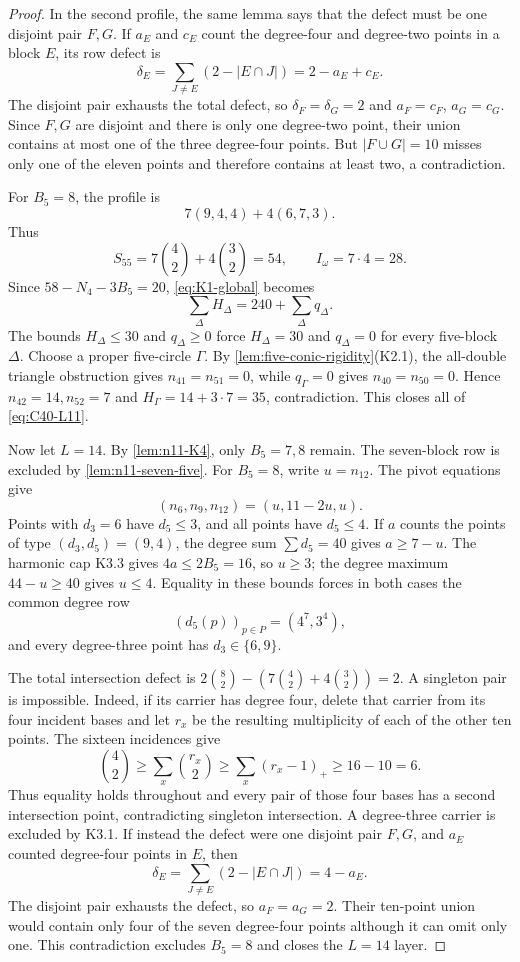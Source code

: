 \begin{proof}
In the second profile, the same lemma says that the defect must be one
disjoint pair $F,G$.  If $a_E$ and $c_E$ count the degree-four and
degree-two points in a block $E$, its row defect is
\[
 \delta_E=\sum_{J\ne E}(2-|E\cap J|)=2-a_E+c_E.
\]
The disjoint pair exhausts the total defect, so
$\delta_F=\delta_G=2$ and $a_F=c_F$, $a_G=c_G$.  Since $F,G$ are disjoint
and there is only one degree-two point, their union contains at most one of
the three degree-four points.  But $|F\cup G|=10$ misses only one of the
eleven points and therefore contains at least two, a contradiction.

For $B_5=8$, the profile is
\[
7(9,4,4)+4(6,7,3).
\]
Thus
\[
 S_{55}=7\binom42+4\binom32=54,
 \qquad I_\omega=7\cdot4=28.
\]
Since $58-N_4-3B_5=20$, \eqref{eq:K1-global} becomes
\[
 \sum_\Delta H_\Delta=240+\sum_\Delta q_\Delta.
\]
The bounds $H_\Delta\le30$ and $q_\Delta\ge0$ force
$H_\Delta=30$ and $q_\Delta=0$ for every five-block $\Delta$.  Choose a
proper five-circle $\Gamma$.  By
\cref{lem:five-conic-rigidity}(K2.1), the all-double triangle obstruction gives
$n_{41}=n_{51}=0$, while $q_\Gamma=0$ gives $n_{40}=n_{50}=0$.  Hence
$n_{42}=14,n_{52}=7$ and
$H_\Gamma=14+3\cdot7=35$, contradiction.  This closes all of
\eqref{eq:C40-L11}.

Now let $L=14$.  By \cref{lem:n11-K4}, only $B_5=7,8$ remain.
The seven-block row is excluded by \cref{lem:n11-seven-five}.  For
$B_5=8$, write $u=n_{12}$.  The pivot equations give
\[
 (n_6,n_9,n_{12})=(u,11-2u,u).
\]
Points with $d_3=6$ have $d_5\le3$, and all points have $d_5\le4$.
If $a$ counts the points of type $(d_3,d_5)=(9,4)$, the degree sum
$\sum d_5=40$ gives $a\ge7-u$.  The harmonic cap K3.3 gives
$4a\le2B_5=16$, so $u\ge3$; the degree maximum $44-u\ge40$ gives
$u\le4$.  Equality in these bounds forces in both cases the common degree
row
\[
 (d_5(p))_{p\in P}=(4^7,3^4),
\]
and every degree-three point has $d_3\in\{6,9\}$.

 The total intersection defect is
 $2\binom82-(7\binom42+4\binom32)=2$.  A singleton pair is impossible.
 Indeed, if its carrier has degree four, delete that carrier from its four
 incident bases and let $r_x$ be the resulting multiplicity of each of the
 other ten points.  The sixteen incidences give
 \[
  \binom42\ge\sum_x\binom{r_x}{2}
  \ge\sum_x(r_x-1)_+\ge16-10=6.
 \]
 Thus equality holds throughout and every pair of those four bases has a
 second intersection point, contradicting singleton intersection.  A
 degree-three carrier is excluded by K3.1.  If instead the defect were one
 disjoint pair $F,G$, and $a_E$
counted degree-four points in $E$, then
\[
 \delta_E=\sum_{J\ne E}(2-|E\cap J|)=4-a_E.
\]
The disjoint pair exhausts the defect, so $a_F=a_G=2$.  Their ten-point
union would contain only four of the seven degree-four points although it
can omit only one.  This contradiction excludes $B_5=8$ and closes the
$L=14$ layer.
\end{proof}

